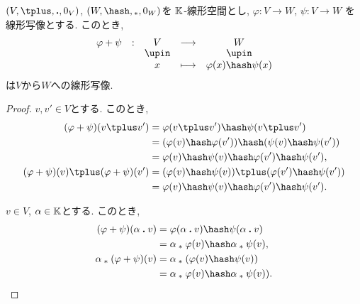 \begin{example}
\label{prop:sumislinear}
  $(V,\plus,\act,0_V)$,
  $(W,\pplus,\aact,0_W)$を
  $\mathbb{K}$-線形空間とし,
  $\varphi\colon V\to W$,
  $\psi\colon V\to W$
  を線形写像とする.
  このとき, 
  \begin{align*}
  \shazo{\varphi+\psi}{V}{W}
  {x}{\varphi(x) \pplus \psi(x)}
  \end{align*}
  は$V$から$W$への線形写像.
\end{example}
\begin{proof}
$v,v'\in V$とする.
このとき,
\begin{align*}
(\varphi+\psi)(v\plus v')
&=\varphi(v\plus v') \pplus \psi(v\plus v')\\
&=(\varphi(v)\pplus \varphi(v')) \pplus (\psi(v)\pplus \psi(v'))\\
&=\varphi(v)\pplus \psi(v)  \pplus \varphi(v')\pplus \psi(v'),
\\
(\varphi+\psi)(v)\plus (\varphi+\psi)(v')
&=
(\varphi(v)\pplus\psi(v))\plus (\varphi(v')\pplus\psi(v'))\\
&=\varphi(v)\pplus \psi(v)  \pplus \varphi(v')\pplus \psi(v').
\end{align*}

$v\in V$, $\alpha\in\mathbb{K}$とする.
このとき,
\begin{align*}
(\varphi+\psi)(\alpha\act v)
&=\varphi(\alpha\act v) \pplus \psi(\alpha\act v)\\
&=\alpha\aact \varphi(v) \pplus \alpha\aact\psi( v),
\\
\alpha\aact(\varphi+\psi)(v)
&=\alpha\aact(\varphi(v)\pplus\psi(v))\\
&=\alpha\aact\varphi(v)\pplus\alpha\aact\psi(v)).
\end{align*}
\end{proof}




